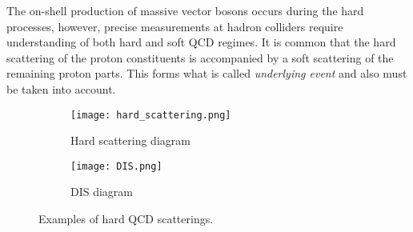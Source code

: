 		The on-shell production of massive vector bosons occurs during the hard processes, however, precise measurements at hadron colliders require understanding of both hard and soft QCD regimes. It is common that the hard scattering of the proton constituents is accompanied by a soft scattering of the remaining proton parts. This forms what is called \textit{underlying event} and also must be taken into account. 
		    	\begin{figure}[htbp]
			\begin{subfigure}[t]{0.42\textwidth} 
				\texttt{[image: hard\_scattering.png]}
				\caption[Transverse view]{Hard scattering diagram}
				\label{fig::hs}
			\end{subfigure}
			\begin{subfigure}[t]{0.52\textwidth}
				\texttt{[image: DIS.png]}
				\caption[Side view]{DIS diagram}
				\label{fig::dis}
			\end{subfigure}
			\hfill
			\caption{Examples of hard QCD scatterings.}
			\label{fig::hadron_qcd}
		\end{figure}
